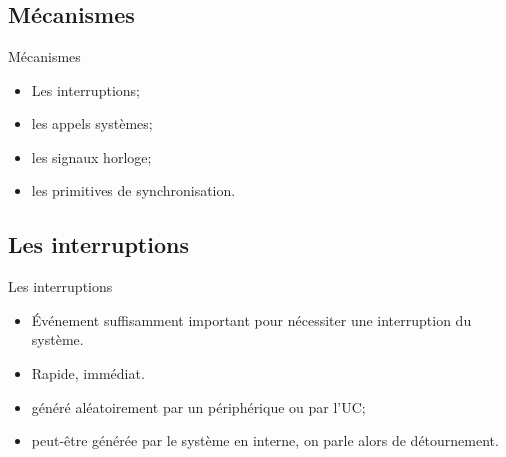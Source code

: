 \section{\sectitle}
\begin{frame}{\sectitle}

\def\subsectitle{Mécanismes}
\subsection{\subsectitle}

\begin{block}{\subsectitle}
\begin{itemize}
    \item Les interruptions;
    \item les appels systèmes;
    \item les signaux horloge;
    \item les primitives de synchronisation.
\end{itemize}
\end{block}


\def\subsectitle{Les interruptions}
\subsection{\subsectitle}

\begin{block}{\subsectitle}
\begin{itemize}
    \item Événement suffisamment important pour nécessiter une interruption du
    système.
    \item Rapide, immédiat.
    \item généré aléatoirement par un périphérique ou par l'UC;
    \item peut-être générée par le système en interne, on parle alors de
    détournement.
\end{itemize}
\end{block}
\end{frame}

